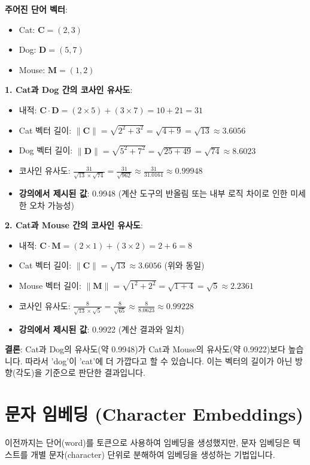 \documentclass[11pt,a4paper]{article}
\theoremstyle{definition}
\begin{document}
\begin{examplebox}
\textbf{주어진 단어 벡터}:
\begin{itemize}
    \item Cat: $\mathbf{C} = (2, 3)$
    \item Dog: $\mathbf{D} = (5, 7)$
    \item Mouse: $\mathbf{M} = (1, 2)$
\end{itemize}

\textbf{1. Cat과 Dog 간의 코사인 유사도}:
\begin{itemize}
    \item 내적: $\mathbf{C} \cdot \mathbf{D} = (2 \times 5) + (3 \times 7) = 10 + 21 = 31$
    \item Cat 벡터 길이: $\|\mathbf{C}\| = \sqrt{2^2 + 3^2} = \sqrt{4 + 9} = \sqrt{13} \approx 3.6056$
    \item Dog 벡터 길이: $\|\mathbf{D}\| = \sqrt{5^2 + 7^2} = \sqrt{25 + 49} = \sqrt{74} \approx 8.6023$
    \item 코사인 유사도: $\frac{31}{\sqrt{13} \times \sqrt{74}} = \frac{31}{\sqrt{962}} \approx \frac{31}{31.0161} \approx 0.99948$
    \item \textbf{강의에서 제시된 값}: 0.9948 (계산 도구의 반올림 또는 내부 로직 차이로 인한 미세한 오차 가능성)
\end{itemize}

\textbf{2. Cat과 Mouse 간의 코사인 유사도}:
\begin{itemize}
    \item 내적: $\mathbf{C} \cdot \mathbf{M} = (2 \times 1) + (3 \times 2) = 2 + 6 = 8$
    \item Cat 벡터 길이: $\|\mathbf{C}\| = \sqrt{13} \approx 3.6056$ (위와 동일)
    \item Mouse 벡터 길이: $\|\mathbf{M}\| = \sqrt{1^2 + 2^2} = \sqrt{1 + 4} = \sqrt{5} \approx 2.2361$
    \item 코사인 유사도: $\frac{8}{\sqrt{13} \times \sqrt{5}} = \frac{8}{\sqrt{65}} \approx \frac{8}{8.0623} \approx 0.99228$
    \item \textbf{강의에서 제시된 값}: 0.9922 (계산 결과와 일치)
\end{itemize}

\textbf{결론}:
Cat과 Dog의 유사도(약 0.9948)가 Cat과 Mouse의 유사도(약 0.9922)보다 높습니다. 따라서 'dog'이 'cat'에 더 가깝다고 할 수 있습니다. 이는 벡터의 길이가 아닌 방향(각도)을 기준으로 판단한 결과입니다.
\end{examplebox}

\newpage
\section{문자 임베딩 (Character Embeddings)}
이전까지는 단어(word)를 토큰으로 사용하여 임베딩을 생성했지만, 문자 임베딩은 텍스트를 개별 문자(character) 단위로 분해하여 임베딩을 생성하는 기법입니다.
\end{document}

